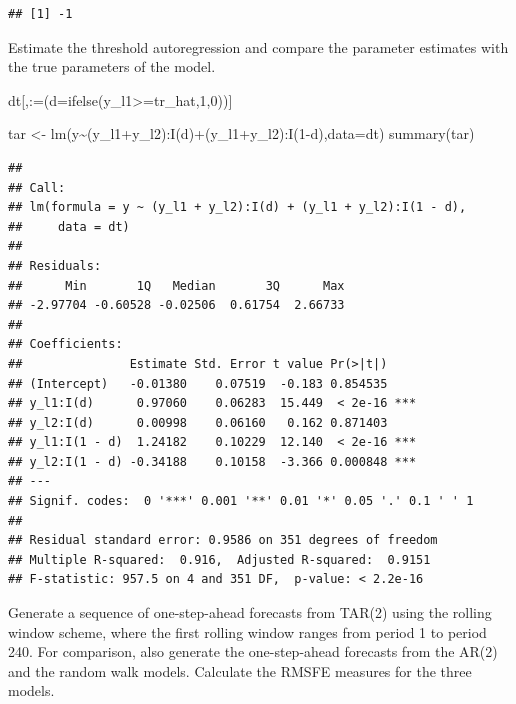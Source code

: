\documentclass[
  12pt,
  oneside]{book}
\newenvironment{Shaded}{\begin{snugshade}}{\end{snugshade}}
\newcommand{\AttributeTok}[1]{\textcolor[rgb]{0.77,0.63,0.00}{#1}}
\newcommand{\DecValTok}[1]{\textcolor[rgb]{0.00,0.00,0.81}{#1}}
\newcommand{\FunctionTok}[1]{\textcolor[rgb]{0.00,0.00,0.00}{#1}}
\newcommand{\NormalTok}[1]{#1}
\newcommand{\OtherTok}[1]{\textcolor[rgb]{0.56,0.35,0.01}{#1}}
\newcommand{\SpecialCharTok}[1]{\textcolor[rgb]{0.00,0.00,0.00}{#1}}
\newcommand{\StringTok}[1]{\textcolor[rgb]{0.31,0.60,0.02}{#1}}
\begin{document}
\begin{verbatim}
## [1] -1
\end{verbatim}

Estimate the threshold autoregression and compare the parameter estimates with the true parameters of the model.

\begin{Shaded}
\begin{Highlighting}[]
\NormalTok{dt[,}\StringTok{\textasciigrave{}}\AttributeTok{:=}\StringTok{\textasciigrave{}}\NormalTok{(}\AttributeTok{d=}\FunctionTok{ifelse}\NormalTok{(y\_l1}\SpecialCharTok{\textgreater{}=}\NormalTok{tr\_hat,}\DecValTok{1}\NormalTok{,}\DecValTok{0}\NormalTok{))]}

\NormalTok{tar }\OtherTok{\textless{}{-}} \FunctionTok{lm}\NormalTok{(y}\SpecialCharTok{\textasciitilde{}}\NormalTok{(y\_l1}\SpecialCharTok{+}\NormalTok{y\_l2)}\SpecialCharTok{:}\FunctionTok{I}\NormalTok{(d)}\SpecialCharTok{+}\NormalTok{(y\_l1}\SpecialCharTok{+}\NormalTok{y\_l2)}\SpecialCharTok{:}\FunctionTok{I}\NormalTok{(}\DecValTok{1}\SpecialCharTok{{-}}\NormalTok{d),}\AttributeTok{data=}\NormalTok{dt)}
\FunctionTok{summary}\NormalTok{(tar)}
\end{Highlighting}
\end{Shaded}

\begin{verbatim}
## 
## Call:
## lm(formula = y ~ (y_l1 + y_l2):I(d) + (y_l1 + y_l2):I(1 - d), 
##     data = dt)
## 
## Residuals:
##      Min       1Q   Median       3Q      Max 
## -2.97704 -0.60528 -0.02506  0.61754  2.66733 
## 
## Coefficients:
##               Estimate Std. Error t value Pr(>|t|)    
## (Intercept)   -0.01380    0.07519  -0.183 0.854535    
## y_l1:I(d)      0.97060    0.06283  15.449  < 2e-16 ***
## y_l2:I(d)      0.00998    0.06160   0.162 0.871403    
## y_l1:I(1 - d)  1.24182    0.10229  12.140  < 2e-16 ***
## y_l2:I(1 - d) -0.34188    0.10158  -3.366 0.000848 ***
## ---
## Signif. codes:  0 '***' 0.001 '**' 0.01 '*' 0.05 '.' 0.1 ' ' 1
## 
## Residual standard error: 0.9586 on 351 degrees of freedom
## Multiple R-squared:  0.916,  Adjusted R-squared:  0.9151 
## F-statistic: 957.5 on 4 and 351 DF,  p-value: < 2.2e-16
\end{verbatim}

Generate a sequence of one-step-ahead forecasts from TAR(2) using the rolling window scheme, where the first rolling window ranges from period 1 to period 240. For comparison, also generate the one-step-ahead forecasts from the AR(2) and the random walk models. Calculate the RMSFE measures for the three models.
\end{document}
